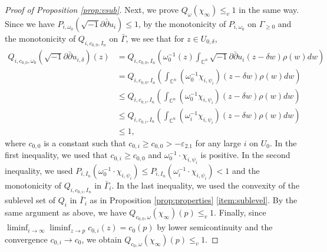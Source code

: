 \documentclass{amsart}
\numberwithin{equation}{section}
\theoremstyle{plain}
\theoremstyle{definition}
\theoremstyle{remark}
\newcommand{\delb}{\sqrt{-1}\partial\bar{\partial}}
\begin{document}
\begin{proof}[Proof of Proposition \ref{prop:vsub}]
    Next, we prove $Q_\omega(\chi_\infty)\le_v1$ in the same way. Since we have $P_{i,\omega_0}(\delb u_i)\le1$, by the monotonicity of $P_{i,\omega_0}$ on $\Gamma_{\ge0}$ and the monotonicity of $Q_{i,c_{0,0},I_n}$ on $\bar{\Gamma}$,  
    we see that for $z \in U_{0,\delta}$,
    \begin{equation}\label{eq:Qconv}
        \begin{split}
        Q_{i,c_{0,0},\omega_0}(\delb u_{i,\delta})(z)
        &=Q_{i,c_{0,0},I_n}\left(\omega^{-1}_0(z) \int_{\mathbb{C}^n}\delb u_i(z-\delta w)\rho(w)dw
        \right)\\
        &=Q_{i,c_{0,0},I_n}\left( \int_{\mathbb{C}^n}(\omega^{-1}_0 \chi_{i,\psi_i})(z-\delta w)\rho(w)dw
        \right)\\
        &\le Q_{i,c_{0,i},I_n}\left( \int_{\mathbb{C}^n}(\omega^{-1}_0 \chi_{i,\psi_i})(z-\delta w)\rho(w)dw
        \right)\\
        &\le Q_{i,c_{0,i},I_n}\left( \int_{\mathbb{C}^n}(\omega^{-1}_i \chi_{i,\psi_i})(z-\delta w)\rho(w)dw
        \right)\\
        &\le 1,
        \end{split}
    \end{equation}
    where $c_{0,0}$ is a constant such that $c_{0,i}\ge c_{0,0}>-\varepsilon_{2.1}$ for any large $i$ on $U_0$.
    In the first inequality, we used that $c_{0,i}\ge c_{0,0}$ and $\omega_0^{-1}\cdot\chi_{i,\psi_i}$ is positive. In the second inequality, we used $P_{i,I_n}(\omega_0^{-1}\cdot\chi_{i,\psi_i})\le P_{i,I_n}(\omega_i^{-1}\cdot\chi_{i,\psi_i})<1$ and the monotonicity of $Q_{i,c_{0,i},I_n}$ in $\bar{\Gamma}_i$. In the last inequality, we used the convexity of the sublevel set of $Q_i$ in $\bar{\Gamma}_i$ as in Proposition \ref{prop:properties} \ref{item:sublevel}. By the same argument as above, we have $Q_{c_{0,0},\omega}(\chi_\infty)(p)\le_v 1$. Finally, since $\liminf_{i\to\infty}\liminf_{z\to p} c_{0,i}(z)=c_0(p)$ by lower semicontinuity and the convergence $c_{0,i}\to c_0$, we obtain $Q_{c_0,\omega}(\chi_\infty)(p)\le_v1$. 
\end{proof}
\end{document}
